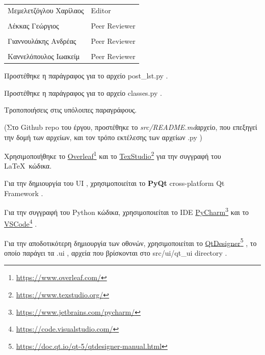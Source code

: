 \documentclass{../ol-softwaremanual}
\newcommand{\doclink}[2]{\href{#1}{#2}\footnote{\url{#1}}}
\begin{document}
	
	\vspace{20pt}
	
	\begin{table}[htbp!]
		\begin{tabular}{ll}
			Μεμελετζόγλου Χαρίλαος & \en Editor \\
			\\ Λέκκας Γεώργιος      &   \en  Peer Reviewer \\
			\\ Γιαννουλάκης Ανδρέας & \en Peer Reviewer \\
			\\ Καννελόπουλος Ιωακείμ & \en Peer Reviewer \\ 
		\end{tabular}
	\end{table}

	\vspace{10pt}
	\vspace{10pt}
	\flushleft
	
	Προστέθηκε η παράγραφος για το αρχείο \en post\_lst.py \gr . \break
	
	Προστέθηκε η παράγραφος για το αρχείο \en classes.py \gr . \break
	
	Τροποποιήσεις στις υπόλοιπες παραγράφους.	\break
	
	(Στο \en Github repo \gr του έργου, προστέθηκε το \en\textit{src/README.md}\gr αρχείο, που επεξηγεί την δομή των αρχείων, και τον τρόπο εκτέλεσης των αρχείων \en .py \gr)
	
	\newpage
	
	
	\vspace{20pt}
	\flushleft
	Χρησιμοποιήθηκε το \en \doclink{https://www.overleaf.com/}{Overleaf} \gr και το \en \doclink{https://www.texstudio.org/}{TexStudio} \gr για την συγγραφή του \LaTeX\ κώδικα. \break
	
	Για την δημιουργία του \en UI \gr, χρησιμοποιείται το \en \textbf{PyQt} cross-platform Qt Framework \gr. \break
	
	Για την συγγραφή του \en Python \gr κώδικα, χρησιμοποιείται το \en IDE \doclink{https://www.jetbrains.com/pycharm/}{PyCharm} \gr και το \en \doclink{https://code.visualstudio.com/}{VSCode} \gr .  \break 
	
	Για την αποδοτικότερη δημιουργία των οθονών, χρησιμοποιείται το \en \doclink{https://doc.qt.io/qt-5/qtdesigner-manual.html}{QtDesigner} \gr, το οποίο παράγει τα \en .ui \gr, αρχεία που βρίσκονται στο \en src/ui/qt\_ui directory \gr . \break
	
\end{document}
